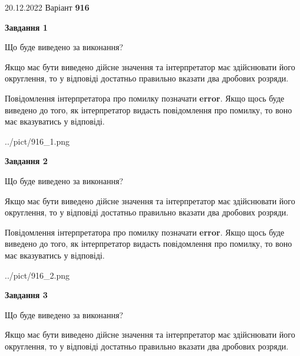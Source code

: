\documentclass[12pt, ukrainian]{article}
\begin{document}
{20.12.2022 Варіант \No \textbf { 916 }\par}
{
\begin {Large}

{\begin {center}\textbf{Завдання 1}\end {center}}\par
Що буде виведено за виконання? \par

Якщо має бути виведено дійсне значення та інтерпретатор має здійснювати його округлення, 
то у відповіді достатньо правильно вказати два дробових розряди.

Повідомлення інтерпретатора про помилку позначати \textbf{error}.
Якщо щось буде виведено до того, як інтерпретатор видасть повідомлення про помилку, 
то воно має вказуватись у відповіді. \par

\begin{center}
	{../pict/916_1.png}
\end{center}
\newpage

{\begin {center}\textbf{Завдання 2}\end {center}}\par
Що буде виведено за виконання? \par

Якщо має бути виведено дійсне значення та інтерпретатор має здійснювати його округлення, 
то у відповіді достатньо правильно вказати два дробових розряди.

Повідомлення інтерпретатора про помилку позначати \textbf{error}.
Якщо щось буде виведено до того, як інтерпретатор видасть повідомлення про помилку, 
то воно має вказуватись у відповіді. \par

\begin{center}
	{../pict/916_2.png}
\end{center}
\newpage

{\begin {center}\textbf{Завдання 3}\end {center}}\par
Що буде виведено за виконання? \par

Якщо має бути виведено дійсне значення та інтерпретатор має здійснювати його округлення, 
то у відповіді достатньо правильно вказати два дробових розряди.


\end{Large}}
\end{document}
